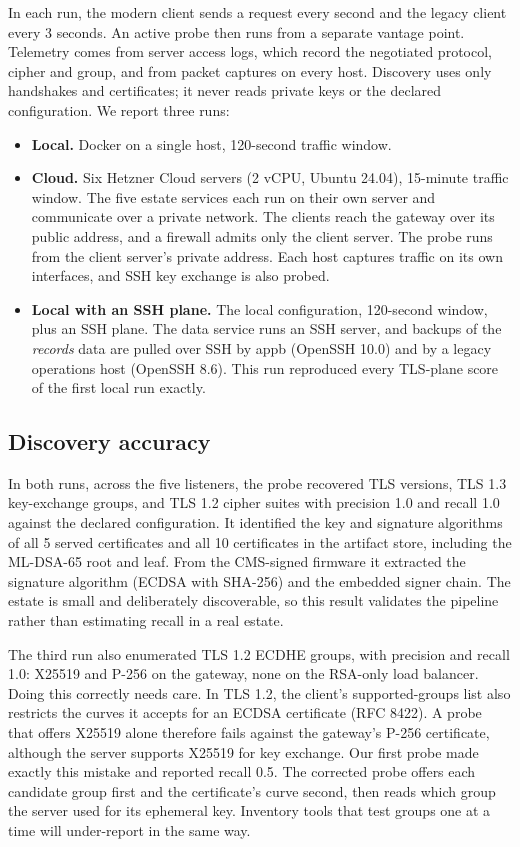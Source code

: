 \documentclass[conference]{IEEEtran}
\begin{document}
In each run, the modern client sends a request every second and the legacy client every 3 seconds. An active probe then runs from a separate vantage point. Telemetry comes from server access logs, which record the negotiated protocol, cipher and group, and from packet captures on every host. Discovery uses only handshakes and certificates; it never reads private keys or the declared configuration. We report three runs:

\begin{itemize}
\item \textbf{Local.} Docker on a single host, 120-second traffic window.
\item \textbf{Cloud.} Six Hetzner Cloud servers (2 vCPU, Ubuntu 24.04), 15-minute traffic window. The five estate services each run on their own server and communicate over a private network. The clients reach the gateway over its public address, and a firewall admits only the client server. The probe runs from the client server's private address. Each host captures traffic on its own interfaces, and SSH key exchange is also probed.
\item \textbf{Local with an SSH plane.} The local configuration, 120-second window, plus an SSH plane. The data service runs an SSH server, and backups of the \emph{records} data are pulled over SSH by appb (OpenSSH 10.0) and by a legacy operations host (OpenSSH 8.6). This run reproduced every TLS-plane score of the first local run exactly.
\end{itemize}

\subsection{Discovery accuracy}\label{sec:13.2}

In both runs, across the five listeners, the probe recovered TLS versions, TLS 1.3 key-exchange groups, and TLS 1.2 cipher suites with precision 1.0 and recall 1.0 against the declared configuration. It identified the key and signature algorithms of all 5 served certificates and all 10 certificates in the artifact store, including the ML-DSA-65 root and leaf. From the CMS-signed firmware it extracted the signature algorithm (ECDSA with SHA-256) and the embedded signer chain. The estate is small and deliberately discoverable, so this result validates the pipeline rather than estimating recall in a real estate.

The third run also enumerated TLS 1.2 ECDHE groups, with precision and recall 1.0: X25519 and P-256 on the gateway, none on the RSA-only load balancer. Doing this correctly needs care. In TLS 1.2, the client's supported-groups list also restricts the curves it accepts for an ECDSA certificate (RFC 8422). A probe that offers X25519 alone therefore fails against the gateway's P-256 certificate, although the server supports X25519 for key exchange. Our first probe made exactly this mistake and reported recall 0.5. The corrected probe offers each candidate group first and the certificate's curve second, then reads which group the server used for its ephemeral key. Inventory tools that test groups one at a time will under-report in the same way.
\end{document}
